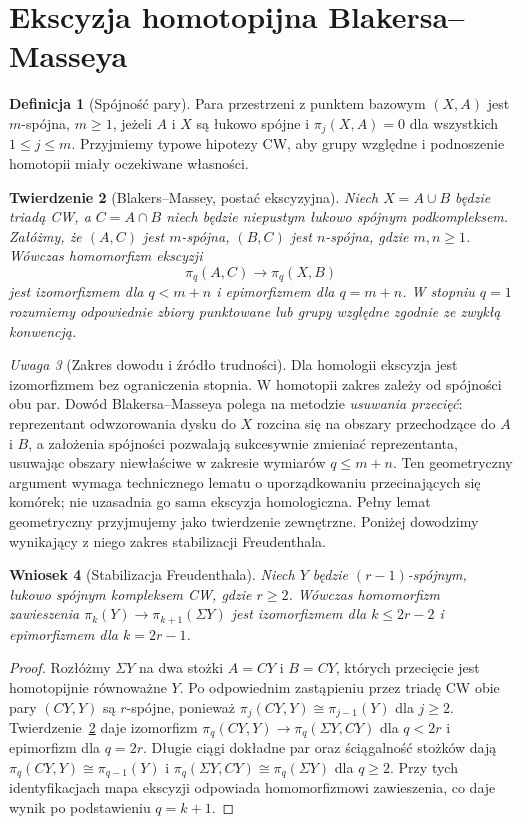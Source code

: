 \documentclass[11pt,a4paper,oneside]{report}
\theoremstyle{plain}
\newtheorem{twierdzenie}{Twierdzenie}[section]
\newtheorem{wniosek}[twierdzenie]{Wniosek}
\theoremstyle{definition}
\newtheorem{definicja}[twierdzenie]{Definicja}
\theoremstyle{remark}
\newtheorem{uwaga}[twierdzenie]{Uwaga}
\begin{document}
\section{Ekscyzja homotopijna Blakersa--Masseya}
\begin{definicja}[Spójność pary]
Para przestrzeni z punktem bazowym $(X,A)$ jest $m$-spójna,
$m\ge1$, jeżeli $A$ i $X$ są łukowo spójne i
$\pi_j(X,A)=0$ dla wszystkich $1\le j\le m$.
Przyjmiemy typowe hipotezy CW, aby grupy względne i
podnoszenie homotopii miały oczekiwane własności.
\end{definicja}
\begin{twierdzenie}[Blakers--Massey, postać ekscyzyjna]
\label{thm:xviii-bm}
Niech $X=A\cup B$ będzie triadą CW, a $C=A\cap B$ niech
będzie niepustym łukowo spójnym podkompleksem.
Załóżmy, że $(A,C)$ jest $m$-spójna, $(B,C)$ jest
$n$-spójna, gdzie $m,n\ge1$.
Wówczas homomorfizm ekscyzji
\[
\pi_q(A,C)\longrightarrow\pi_q(X,B)
\]
jest izomorfizmem dla $q<m+n$ i epimorfizmem dla $q=m+n$.
W stopniu $q=1$ rozumiemy odpowiednie zbiory punktowane
lub grupy względne zgodnie ze zwykłą konwencją.
\end{twierdzenie}
\begin{uwaga}[Zakres dowodu i źródło trudności]
Dla homologii ekscyzja jest izomorfizmem bez ograniczenia
stopnia. W homotopii zakres zależy od spójności obu par.
Dowód Blakersa--Masseya polega na metodzie \emph{usuwania
przecięć}: reprezentant odwzorowania dysku do $X$ rozcina
się na obszary przechodzące do $A$ i $B$, a założenia
spójności pozwalają sukcesywnie zmieniać reprezentanta,
usuwając obszary niewłaściwe w zakresie wymiarów
$q\le m+n$. Ten geometryczny argument wymaga
technicznego lematu o uporządkowaniu przecinających się
komórek; nie uzasadnia go sama ekscyzja homologiczna.
Pełny lemat geometryczny przyjmujemy jako twierdzenie
zewnętrzne. Poniżej dowodzimy wynikający z niego
zakres stabilizacji Freudenthala.
\end{uwaga}
\begin{wniosek}[Stabilizacja Freudenthala]
\label{cor:xviii-freudenthal}
Niech $Y$ będzie $(r-1)$-spójnym, łukowo spójnym
kompleksem CW, gdzie $r\ge2$. Wówczas homomorfizm
zawieszenia
$\pi_k(Y)\to\pi_{k+1}(\Sigma Y)$ jest izomorfizmem
dla $k\le2r-2$ i epimorfizmem dla $k=2r-1$.
\end{wniosek}
\begin{proof}
Rozłóżmy $\Sigma Y$ na dwa stożki $A=CY$ i $B=CY$,
których przecięcie jest homotopijnie równoważne $Y$.
Po odpowiednim zastąpieniu przez triadę CW
obie pary $(CY,Y)$ są $r$-spójne, ponieważ
$\pi_j(CY,Y)\cong\pi_{j-1}(Y)$ dla $j\ge2$.
Twierdzenie~\ref{thm:xviii-bm} daje izomorfizm
$\pi_q(CY,Y)\to\pi_q(\Sigma Y,CY)$ dla $q<2r$
i epimorfizm dla $q=2r$.
Długie ciągi dokładne par oraz ściągalność stożków
dają $\pi_q(CY,Y)\cong\pi_{q-1}(Y)$ i
$\pi_q(\Sigma Y,CY)\cong\pi_q(\Sigma Y)$ dla $q\ge2$.
Przy tych identyfikacjach mapa ekscyzji odpowiada
homomorfizmowi zawieszenia, co daje wynik po podstawieniu
$q=k+1$.
\end{proof}
\end{document}
